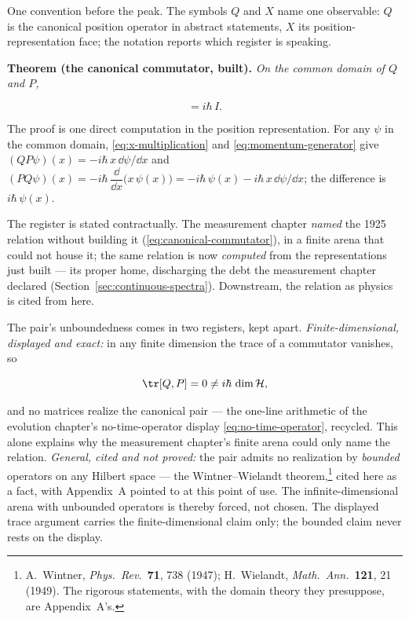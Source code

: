 One convention before the peak. The symbols $Q$ and $X$ name one observable: $Q$ is the canonical position operator in abstract statements, $X$ its position-representation face; the notation reports which register is speaking.

\medskip\noindent\textbf{Theorem (the canonical commutator, built).} \emph{On the common domain of $Q$ and $P$,}
\begin{linenomath}
    \begin{equation}
        [Q, P] = i\hbar\,I .
        \label{eq:canonical-commutator-built}
    \end{equation}
\end{linenomath}
The proof is one direct computation in the position representation. For any $\psi$ in the common domain, \eqref{eq:x-multiplication} and \eqref{eq:momentum-generator} give $(QP\psi)(x) = -i\hbar\,x\,\dd\psi/\dd x$ and $(PQ\psi)(x) = -i\hbar\,\dfrac{\dd}{\dd x}\bigl(x\,\psi(x)\bigr) = -i\hbar\,\psi(x) - i\hbar\,x\,\dd\psi/\dd x$; the difference is $i\hbar\,\psi(x)$.

The register is stated contractually. The measurement chapter \emph{named} the 1925 relation without building it (\eqref{eq:canonical-commutator}), in a finite arena that could not house it; the same relation is now \emph{computed} from the representations just built --- its proper home, discharging the debt the measurement chapter declared (Section~\ref{sec:continuous-spectra}). Downstream, the relation as physics is cited from here.

\begin{note}
The pair's unboundedness comes in two registers, kept apart. \emph{Finite-dimensional, displayed and exact:} in any finite dimension the trace of a commutator vanishes, so
\begin{linenomath}
    \begin{equation}
        \tr[Q, P] = 0 \neq i\hbar\,\dim\mathcal{H},
        \label{eq:trace-obstruction}
    \end{equation}
\end{linenomath}
and no matrices realize the canonical pair --- the one-line arithmetic of the evolution chapter's no-time-operator display \eqref{eq:no-time-operator}, recycled. This alone explains why the measurement chapter's finite arena could only name the relation. \emph{General, cited and not proved:} the pair admits no realization by \emph{bounded} operators on any Hilbert space --- the Wintner--Wielandt theorem,\footnote{A.~Wintner, \emph{Phys.~Rev.}~\textbf{71}, 738 (1947); H.~Wielandt, \emph{Math.~Ann.}~\textbf{121}, 21 (1949). The rigorous statements, with the domain theory they presuppose, are Appendix~A's.} cited here as a fact, with Appendix~A pointed to at this point of use. The infinite-dimensional arena with unbounded operators is thereby forced, not chosen. The displayed trace argument carries the finite-dimensional claim only; the bounded claim never rests on the display.
\end{note}

